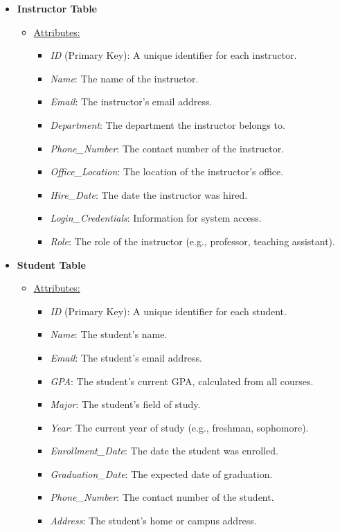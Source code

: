 \documentclass[12pt]{article}
\begin{document}
\begin{itemize}
    \item \textbf{Instructor Table}
    \begin{itemize}
        \item \underline{Attributes:}
        \begin{itemize}
            \item \textit{ID} (Primary Key): A unique identifier for each instructor.
            \item \textit{Name}: The name of the instructor.
            \item \textit{Email}: The instructor's email address.
            \item \textit{Department}: The department the instructor belongs to.
            \item \textit{Phone\_Number}: The contact number of the instructor.
            \item \textit{Office\_Location}: The location of the instructor's office.
            \item \textit{Hire\_Date}: The date the instructor was hired.
            \item \textit{Login\_Credentials}: Information for system access.
            \item \textit{Role}: The role of the instructor (e.g., professor, teaching assistant).
        \end{itemize}
    \end{itemize}
    
    \item \textbf{Student Table}
    \begin{itemize}
        \item \underline{Attributes:}
        \begin{itemize}
            \item \textit{ID} (Primary Key): A unique identifier for each student.
            \item \textit{Name}: The student's name.
            \item \textit{Email}: The student's email address.
            \item \textit{GPA}: The student's current GPA, calculated from all courses.
            \item \textit{Major}: The student's field of study.
            \item \textit{Year}: The current year of study (e.g., freshman, sophomore).
            \item \textit{Enrollment\_Date}: The date the student was enrolled.
            \item \textit{Graduation\_Date}: The expected date of graduation.
            \item \textit{Phone\_Number}: The contact number of the student.
            \item \textit{Address}: The student's home or campus address.
        \end{itemize}
    \end{itemize}
    

\end{itemize}
\end{document}
